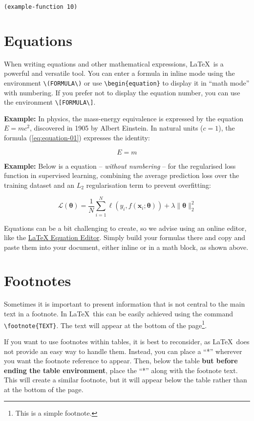 {\begin{longlisting}
\begin{verbatim}
(example-function 10)
\end{verbatim}
\end{longlisting}

\section{Equations}
When writing equations and other mathematical expressions, \LaTeX~is a powerful and versatile tool. You can enter a formula in inline mode using the environment \verb|\(FORMULA\)| or use \verb|\begin{equation}| to display it in ``math mode'' with numbering. If you prefer not to display the equation number, you can use the environment \verb|\[FORMULA\]|.

\vspace{.875em}
\textbf{Example:} In physics, the mass-energy equivalence is expressed by the equation \(E=mc^2\), discovered in 1905 by Albert Einstein. In natural units ($c = 1$), the formula (\ref{eq:equation-01}) expresses the identity:

\begin{equation}
\label{eq:equation-01}
E=m
\end{equation}

\textbf{Example:} Below is a equation -- \textit{without numbering} -- for the regularised loss function in supervised learning, combining the average prediction loss over the training dataset and an $L_2$ regularisation term to prevent overfitting:

\[
\mathcal{L}(\boldsymbol{\theta}) = \frac{1}{N} \sum_{i=1}^{N} \ell(y_i, f(\mathbf{x}_i; \boldsymbol{\theta})) + \lambda \|\boldsymbol{\theta}\|_2^2
\]

Equations can be a bit challenging to create, so we advise using an online editor, like the \href{https://latexeditor.lagrida.com/}{LaTeX Equation Editor}. Simply build your formulas there and copy and paste them into your document, either inline or in a math block, as shown above.

\section{Footnotes}
Sometimes it is important to present information that is not central to the main text in a footnote. In \LaTeX\, this can be easily achieved using the command \verb|\footnote{TEXT}|. The text will appear at the bottom of the page\footnote{This is a simple footnote.}.

If you want to use footnotes within tables, it is best to reconsider, as \LaTeX\ does not provide an easy way to handle them. Instead, you can place a ``*'' wherever you want the footnote reference to appear. Then, below the table \textbf{but before ending the table environment}, place the ``*'' along with the footnote text. This will create a similar footnote, but it will appear below the table rather than at the bottom of the page.
}